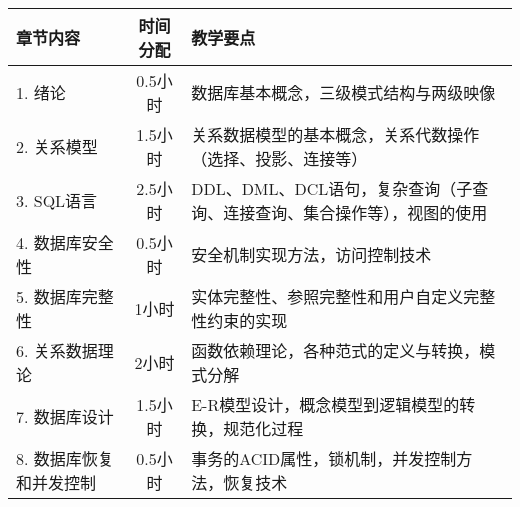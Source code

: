 \documentclass{../note}
\begin{document}
\begin{tabular}{|l|c|p{8cm}|}
  \hline
  \textbf{章节内容} & \textbf{时间分配} & \textbf{教学要点} \\
  \hline
  1. 绪论 & 0.5小时 &
  数据库基本概念，三级模式结构与两级映像 \\
  \hline
  2. 关系模型 & 1.5小时 &
  关系数据模型的基本概念，关系代数操作（选择、投影、连接等） \\
  \hline
  3. SQL语言 & 2.5小时 &
  DDL、DML、DCL语句，复杂查询（子查询、连接查询、集合操作等），视图的使用 \\
  \hline
  4. 数据库安全性 & 0.5小时 &
  安全机制实现方法，访问控制技术 \\
  \hline
  5. 数据库完整性 & 1小时 &
  实体完整性、参照完整性和用户自定义完整性约束的实现 \\
  \hline
  6. 关系数据理论 & 2小时 &
  函数依赖理论，各种范式的定义与转换，模式分解 \\
  \hline
  7. 数据库设计 & 1.5小时 &
  E-R模型设计，概念模型到逻辑模型的转换，规范化过程 \\
  \hline
  8. 数据库恢复和并发控制 & 0.5小时 &
  事务的ACID属性，锁机制，并发控制方法，恢复技术 \\
  \hline
\end{tabular}
\end{document}
